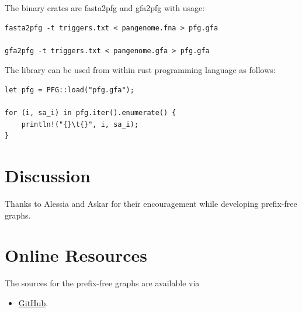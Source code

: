 \documentclass[twocolumn]{ceurart}
\begin{document}
The binary crates are fasta2pfg and gfa2pfg with usage:
\begin{verbatim}
fasta2pfg -t triggers.txt < pangenome.fna > pfg.gfa

gfa2pfg -t triggers.txt < pangenome.gfa > pfg.gfa
\end{verbatim}

The library can be used from within rust programming language as follows:

\begin{verbatim}
let pfg = PFG::load("pfg.gfa");

for (i, sa_i) in pfg.iter().enumerate() {
    println!("{}\t{}", i, sa_i);
}
\end{verbatim}

\section{Discussion}

\begin{acknowledgments}
    Thanks to Alessia and Askar for their encouragement while developing prefix-free graphs.
\end{acknowledgments}



\appendix

\section{Online Resources}

The sources for the prefix-free graphs are available via
\begin{itemize}
\item \href{https://github.com/andynet/pfg}{GitHub}.
\end{itemize}
\end{document}
